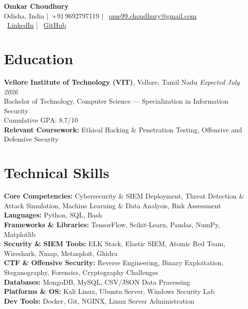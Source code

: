 \documentclass[a4paper,10pt]{article}
\begin{document}
\begin{center}
    {\Huge \textbf{Omkar Choudhury}}\\[3pt]
    Odisha, India \quad|\quad \faPhone\ +91\,9692797119 \quad|\quad
    \faEnvelope\ \href{mailto:ome99.choudhury@gmail.com}{ome99.choudhury@gmail.com}\\[1pt]
    \faLinkedin\ \href{https://www.linkedin.com/in/omkar-choudhury-5b072a169}{LinkedIn} \quad|\quad
    \faGithub\ \href{https://github.com/Ome9}{GitHub}
\end{center}

\section{Education}
\vspace{4pt}
\textbf{Vellore Institute of Technology (VIT)}, Vellore, Tamil Nadu \hfill \textit{Expected July 2026}\\
Bachelor of Technology, Computer Science — Specialization in Information Security\\
Cumulative GPA: 8.7/10\\
\textbf{Relevant Coursework:} Ethical Hacking \& Penetration Testing, Offensive and Defensive Security

\section{Technical Skills}
\vspace{4pt}
\textbf{Core Competencies:} Cybersecurity \& SIEM Deployment, Threat Detection \& Attack Simulation, Machine Learning \& Data Analysis, Risk Assessment\\
\textbf{Languages:} Python, SQL, Bash\\
\textbf{Frameworks \& Libraries:} TensorFlow, Scikit-Learn, Pandas, NumPy, Matplotlib\\
\textbf{Security \& SIEM Tools:} ELK Stack, Elastic SIEM, Atomic Red Team, Wireshark, Nmap, Metasploit, Ghidra\\
\textbf{CTF \& Offensive Security:} Reverse Engineering, Binary Exploitation, Steganography, Forensics, Cryptography Challenges\\
\textbf{Databases:} MongoDB, MySQL, CSV/JSON Data Processing\\
\textbf{Platforms \& OS:} Kali Linux, Ubuntu Server, Windows Security Lab\\
\textbf{Dev Tools:} Docker, Git, NGINX, Linux Server Administration
\end{document}
